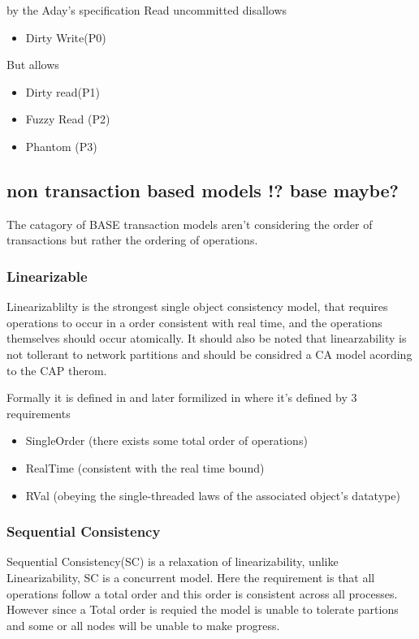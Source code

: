 \documentclass[a4paper,10pt,titlepage]{report}
\begin{document}
    by the Aday's specification Read uncommitted disallows
    \begin{itemize}
        \item Dirty Write(P0)
    \end{itemize}
    But allows
    \begin{itemize}
        \item Dirty read(P1)
        \item Fuzzy Read (P2)
        \item Phantom (P3)
    \end{itemize}

    \subsection{non transaction based models !? base maybe?}
    The catagory of BASE transaction models aren't considering the order of transactions but rather the ordering of operations.

    \subsubsection{Linearizable}
    Linearizablilty is the strongest single object consistency model, that requires operations to occur in a order consistent with real time, and the operations themselves should occur atomically. It should also be noted that linearzability is not tollerant to network partitions and should be considred a CA model acording to the CAP therom.

    Formally it is defined in \cite{Linearizability} and later formilized in \cite{ConsistencyinNonTransactionalDistributedStorageSystems} where it's defined by 3 requirements


    \begin{itemize}
    \item SingleOrder (there exists some total order of operations)
    \item RealTime (consistent with the real time bound)
    \item RVal (obeying the single-threaded laws of the associated object's datatype)
\end{itemize} 


    \subsubsection{Sequential Consistency}
    Sequential Consistency(SC) is a relaxation of linearizability, unlike Linearizability, SC is a concurrent model. Here the requirement is that all operations follow a total order and this order is consistent across all processes. However since a Total order is requied the model is unable to tolerate partions and some or all nodes will be unable to make progress. \\
\end{document}
